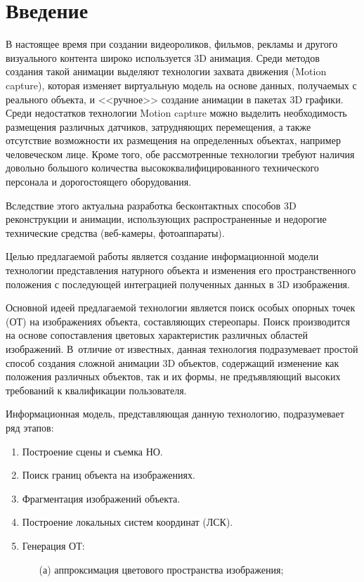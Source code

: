       \thispagestyle{headings}

      \begin{multicols}{2}

            \label{st\stat}
  

\section{Введение}

  В настоящее время при создании видеороликов, фильмов, рекламы и другого 
визуального контента широко используется 3D анимация. Среди 
методов создания такой анимации выделяют технологии захва\-та движения 
(Motion capture), которая изменяет виртуальную модель на основе данных, 
по\-лу\-ча\-емых с реального объекта, и <<ручное>> создание анимации в пакетах 
3D графики. Среди недостатков технологии Motion capture можно 
выделить не\-об\-хо\-ди\-мость размещения различных датчиков, затрудняющих 
перемещения, а также отсутствие воз\-мож\-ности их размещения на 
определенных объектах, например человеческом лице. Кроме того, обе 
рассмотренные технологии требуют наличия довольно большого количества 
высококвалифицированного технического персонала и дорогостоящего 
оборудования.
  
  Вследствие этого актуальна разработка бесконтактных способов 3D
реконструкции и анимации, использующих распространенные и недорогие 
технические средства (веб-ка\-ме\-ры, фотоаппараты).
  
  Целью предлагаемой работы является создание информационной модели 
технологии представления натурного объекта и изменения его 
пространственного положения с последующей интеграцией полученных 
данных в 3D изображения.
  
  Основной идеей предлагаемой технологии является поиск особых опорных 
точек (ОТ) на изображениях объекта, составляющих стереопары. Поиск 
производится на основе сопоставления цветовых характеристик различных 
областей изображений. В~отличие от известных, данная технология 
подразумевает простой способ создания сложной анимации 3D
объектов, содержащий изменение как положения различных объектов, так и их 
формы, не предъявляющий высоких требований к квалификации пользователя. 
  
  Информационная модель, представляющая данную технологию, 
подразумевает ряд этапов:
  \begin{enumerate}[1.]
\item Построение сцены и съемка НО.
\item Поиск границ объекта на изображениях.
\item Фрагментация изображений объекта.
\item Построение локальных систем координат (ЛСК).
\item Генерация ОТ:
\begin{itemize}
    \item[(а)] аппроксимация цветового пространства изображения;


\end{itemize}
\end{enumerate}
\end{multicols}
